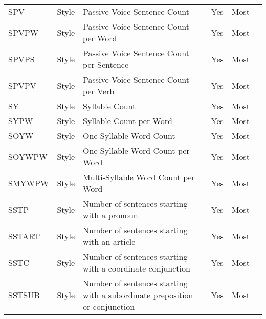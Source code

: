 \begin{longtable}{l l m{} c c m{}}
    SPV & Style & Passive Voice Sentence Count & Yes & Most & \cite{Dalip2009_lr14, Wang2020_lr26, Wu2010_lr61, Wang2019_lr74, Bassani2019_lr359, Dalip2016_lr1002, Dalip2011_lr1003, Dalip2014_lr1004, Olcer2022_lr2017, Magalhaes2019_lr2028} \\
    SPVPW & Style & Passive Voice Sentence Count per Word & Yes & Most & \cite{Bassani2019_lr359} \\
    SPVPS & Style & Passive Voice Sentence Count per Sentence & Yes & Most & \cite{Anderka2012_lr17, Ferretti2012_lr115, Pereyra2019_lr147, Bassani2019_lr359} \\
    SPVPV & Style & Passive Voice Sentence Count per Verb & Yes & Most & \cite{Bassani2019_lr359} \\
    SY & Style & Syllable Count & Yes & Most & \cite{Blumenstock2008_lr4, Anderka2012_lr17, Ferretti2012_lr115, Dang2021_lr136, Pereyra2019_lr147, Bassani2019_lr359} \\
    SYPW & Style & Syllable Count per Word & Yes & Most & \cite{Anderka2012_lr17, Ferretti2012_lr115, Pereyra2019_lr147, Bassani2019_lr359} \\
    SOYW & Style & One-Syllable Word Count & Yes & Most & \cite{Blumenstock2008_lr4, Anderka2012_lr17, Ferretti2012_lr115, Pereyra2019_lr147} \\
    SOYWPW & Style & One-Syllable Word Count per Word & Yes & Most & \cite{Anderka2012_lr17, Ferretti2012_lr115, Pereyra2019_lr147} \\
    SMYWPW & Style & Multi-Syllable Word Count per Word & Yes & Most & \cite{Wu2010_lr61, Marzini2014_lr2010} \\
    SSTP & Style & Number of sentences starting with a pronoun & Yes & Most & \cite{Dalip2009_lr14, Wang2020_lr26, Wang2019_lr74, Bassani2019_lr359, Dalip2011_lr1003, Dalip2014_lr1004, Olcer2022_lr2017, Magalhaes2019_lr2028} \\
    SSTART & Style & Number of sentences starting with an article & Yes & Most & \cite{Dalip2009_lr14, Wang2020_lr26, Wang2019_lr74, Bassani2019_lr359, Dalip2011_lr1003, Dalip2014_lr1004, Magalhaes2019_lr2028} \\
    SSTC & Style & Number of sentences starting with a coordinate conjunction & Yes & Most & \cite{Dalip2009_lr14, Wang2020_lr26, Wang2019_lr74, Bassani2019_lr359, Dalip2011_lr1003, Dalip2014_lr1004, Magalhaes2019_lr2028} \\
    SSTSUB & Style & Number of sentences starting with a subordinate preposition or conjunction & Yes & Most & \cite{Dalip2009_lr14, Wang2020_lr26, Wang2019_lr74, Bassani2019_lr359, Dalip2011_lr1003, Dalip2014_lr1004, Magalhaes2019_lr2028} \\

\end{longtable}
